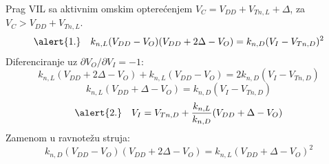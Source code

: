 \begin{frame}[label=09_1-s040]{Prag VIL sa aktivnim omskim opterećenjem}\setlength{\parskip}{2pt}\setlength{\abovedisplayskip}{4pt}\setlength{\belowdisplayskip}{4pt}\setlength{\abovedisplayshortskip}{3pt}\setlength{\belowdisplayshortskip}{3pt}
$V_C=V_{DD}+V_{Tn,L}+\Delta$, za $V_C>V_{DD}+V_{Tn,L}$.\[\alert{1.}\quad k_{n,L}(V_{DD}-V_O)(V_{DD}+2\Delta-V_O)=k_{n,D}(V_I-V_{Tn,D})^2\]
Diferenciranje uz $\partial V_O/\partial V_I=-1$:\[k_{n,L}(V_{DD}+2\Delta-V_O)+k_{n,L}(V_{DD}-V_O)=2k_{n,D}(V_I-V_{Tn,D})\]
\[k_{n,L}(V_{DD}+\Delta-V_O)=k_{n,D}(V_I-V_{Tn,D})\]
\[\alert{2.}\quad V_I=V_{Tn,D}+\frac{k_{n,L}}{k_{n,D}}(V_{DD}+\Delta-V_O)\]
Zamenom u ravnotežu struja:\[k_{n,D}(V_{DD}-V_O)(V_{DD}+2\Delta-V_O)=k_{n,L}(V_{DD}+\Delta-V_O)^2\]

\end{frame}
